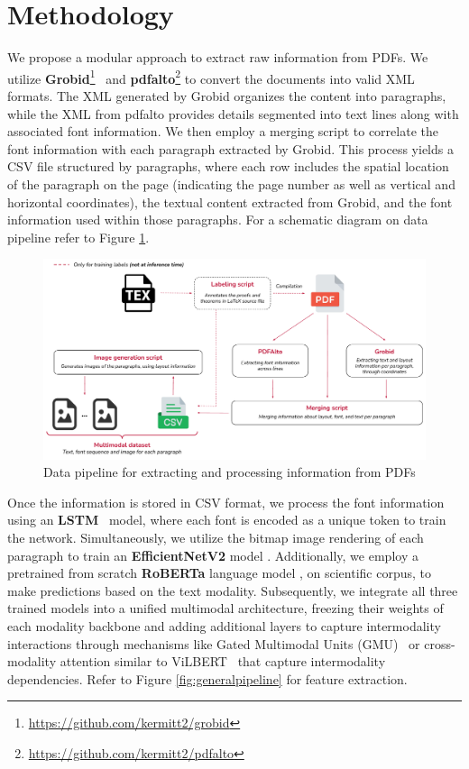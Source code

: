 \documentclass[runningheads]{llncs}
\begin{document}
\section{Methodology}
We propose a modular approach to extract raw information from PDFs. We
utilize
\textbf{Grobid}\footnote{\url{https://github.com/kermitt2/grobid}}~\cite{grobid}
and \textbf{pdfalto}\footnote{\url{https://github.com/kermitt2/pdfalto}} to convert
the documents into valid XML formats. The XML generated by Grobid organizes the content into paragraphs,
while the XML from pdfalto provides details segmented into text lines along with associated font information.
We then employ a merging script to correlate the font information with each paragraph extracted by Grobid.
This process yields a CSV file structured by paragraphs, where each row includes the spatial location of the
paragraph on the page (indicating the page number as well as vertical and horizontal coordinates), the textual content
extracted from Grobid, and the font information used within those paragraphs. For a schematic diagram on data pipeline
refer to Figure \ref{fig:datapipeline}.

\begin{figure}
	\centering
	\includegraphics[width=.9\textwidth]{images/preprocessing.pdf}
	\caption{Data pipeline for extracting and processing information from PDFs}
	\label{fig:datapipeline}
\end{figure}

Once the information is stored in CSV format, we process the font information using an \textbf{LSTM}~\cite{hochreiter1997long} model, where
each font is encoded as a unique token to train the network. Simultaneously, we utilize the bitmap image
rendering of each paragraph to train an \textbf{EfficientNetV2} model
\cite{tan2021efficientnetv2}. Additionally, we employ a pretrained from
scratch \textbf{RoBERTa} language model \cite{phdthesis},
on scientific corpus, to make predictions based on the text modality. Subsequently, we
integrate all three trained models into a unified multimodal architecture, freezing their weights of each modality backbone and adding
additional layers to capture intermodality interactions through mechanisms like Gated Multimodal Units
(GMU)~\cite{arevalo2020gated} or cross-modality attention similar to
ViLBERT~\cite{lu2019vilbert} that capture intermodality dependencies. Refer to Figure \ref{fig:generalpipeline} for feature extraction.
\end{document}
